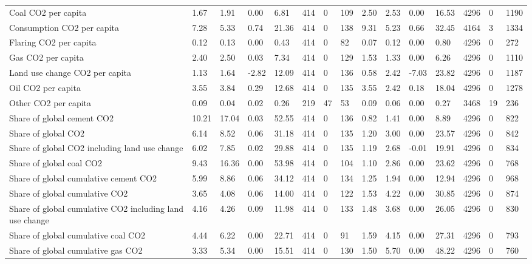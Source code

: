 \begin{longtable}{lllllllllllllll}
Coal CO2 per capita & 1.67 & 1.91 & 0.00 & 6.81 & 414 & 0 & 109 & 2.50 & 2.53 & 0.00 & 16.53 & 4296 & 0 & 1190\\
Consumption CO2 per capita & 7.28 & 5.33 & 0.74 & 21.36 & 414 & 0 & 138 & 9.31 & 5.23 & 0.66 & 32.45 & 4164 & 3 & 1334\\
\addlinespace
Flaring CO2 per capita & 0.12 & 0.13 & 0.00 & 0.43 & 414 & 0 & 82 & 0.07 & 0.12 & 0.00 & 0.80 & 4296 & 0 & 272\\
Gas CO2 per capita & 2.40 & 2.50 & 0.03 & 7.34 & 414 & 0 & 129 & 1.53 & 1.33 & 0.00 & 6.26 & 4296 & 0 & 1110\\
Land use change CO2 per capita & 1.13 & 1.64 & -2.82 & 12.09 & 414 & 0 & 136 & 0.58 & 2.42 & -7.03 & 23.82 & 4296 & 0 & 1187\\
Oil CO2 per capita & 3.55 & 3.84 & 0.29 & 12.68 & 414 & 0 & 135 & 3.55 & 2.42 & 0.18 & 18.04 & 4296 & 0 & 1278\\
Other CO2 per capita & 0.09 & 0.04 & 0.02 & 0.26 & 219 & 47 & 53 & 0.09 & 0.06 & 0.00 & 0.27 & 3468 & 19 & 236\\
\addlinespace
Share of global cement CO2 & 10.21 & 17.04 & 0.03 & 52.55 & 414 & 0 & 136 & 0.82 & 1.41 & 0.00 & 8.89 & 4296 & 0 & 822\\
Share of global CO2 & 6.14 & 8.52 & 0.06 & 31.18 & 414 & 0 & 135 & 1.20 & 3.00 & 0.00 & 23.57 & 4296 & 0 & 842\\
Share of global CO2 including land use change & 6.02 & 7.85 & 0.02 & 29.88 & 414 & 0 & 135 & 1.19 & 2.68 & -0.01 & 19.91 & 4296 & 0 & 834\\
Share of global coal CO2 & 9.43 & 16.36 & 0.00 & 53.98 & 414 & 0 & 104 & 1.10 & 2.86 & 0.00 & 23.62 & 4296 & 0 & 768\\
Share of global cumulative cement CO2 & 5.99 & 8.86 & 0.06 & 34.12 & 414 & 0 & 134 & 1.25 & 1.94 & 0.00 & 12.94 & 4296 & 0 & 968\\
\addlinespace
Share of global cumulative CO2 & 3.65 & 4.08 & 0.06 & 14.00 & 414 & 0 & 122 & 1.53 & 4.22 & 0.00 & 30.85 & 4296 & 0 & 874\\
Share of global cumulative CO2 including land use change & 4.16 & 4.26 & 0.09 & 11.98 & 414 & 0 & 133 & 1.48 & 3.68 & 0.00 & 26.05 & 4296 & 0 & 830\\
Share of global cumulative coal CO2 & 4.44 & 6.22 & 0.00 & 22.71 & 414 & 0 & 91 & 1.59 & 4.15 & 0.00 & 27.31 & 4296 & 0 & 793\\
Share of global cumulative gas CO2 & 3.33 & 5.34 & 0.00 & 15.51 & 414 & 0 & 130 & 1.50 & 5.70 & 0.00 & 48.22 & 4296 & 0 & 760\\

\end{longtable}
